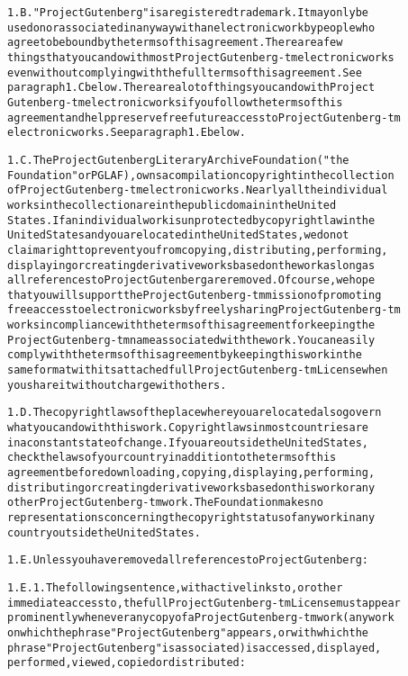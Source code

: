 \documentclass[12pt]{book}[2005/09/16]
\newenvironment{PGtext}{%
\begin{alltt}
%****
\fontsize{8.1}{10}\ttfamily\selectfont}%
{\end{alltt}}
\begin{document}
\begin{PGtext}
1.B. "Project Gutenberg" is a registered trademark. It may only be
used on or associated in any way with an electronic work by people who
agree to be bound by the terms of this agreement. There are a few
things that you can do with most Project Gutenberg-tm electronic works
even without complying with the full terms of this agreement. See
paragraph 1.C below. There are a lot of things you can do with Project
Gutenberg-tm electronic works if you follow the terms of this
agreement and help preserve free future access to Project Gutenberg-tm
electronic works. See paragraph 1.E below.

1.C. The Project Gutenberg Literary Archive Foundation ("the
Foundation" or PGLAF), owns a compilation copyright in the collection
of Project Gutenberg-tm electronic works. Nearly all the individual
works in the collection are in the public domain in the United
States. If an individual work is unprotected by copyright law in the
United States and you are located in the United States, we do not
claim a right to prevent you from copying, distributing, performing,
displaying or creating derivative works based on the work as long as
all references to Project Gutenberg are removed. Of course, we hope
that you will support the Project Gutenberg-tm mission of promoting
free access to electronic works by freely sharing Project Gutenberg-tm
works in compliance with the terms of this agreement for keeping the
Project Gutenberg-tm name associated with the work. You can easily
comply with the terms of this agreement by keeping this work in the
same format with its attached full Project Gutenberg-tm License when
you share it without charge with others.

1.D. The copyright laws of the place where you are located also govern
what you can do with this work. Copyright laws in most countries are
in a constant state of change. If you are outside the United States,
check the laws of your country in addition to the terms of this
agreement before downloading, copying, displaying, performing,
distributing or creating derivative works based on this work or any
other Project Gutenberg-tm work. The Foundation makes no
representations concerning the copyright status of any work in any
country outside the United States.

1.E. Unless you have removed all references to Project Gutenberg:

1.E.1. The following sentence, with active links to, or other
immediate access to, the full Project Gutenberg-tm License must appear
prominently whenever any copy of a Project Gutenberg-tm work (any work
on which the phrase "Project Gutenberg" appears, or with which the
phrase "Project Gutenberg" is associated) is accessed, displayed,
performed, viewed, copied or distributed:


\end{PGtext}
\end{document}
